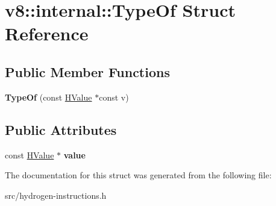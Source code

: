 \hypertarget{structv8_1_1internal_1_1_type_of}{}\section{v8\+:\+:internal\+:\+:Type\+Of Struct Reference}
\label{structv8_1_1internal_1_1_type_of}
\subsection*{Public Member Functions}
\begin{DoxyCompactItemize}
\item 
\hypertarget{structv8_1_1internal_1_1_type_of_a1ba1a45c67d36246ba6075172ca12ee0}{}{\bfseries Type\+Of} (const \hyperlink{classv8_1_1internal_1_1_h_value}{H\+Value} $\ast$const v)\label{structv8_1_1internal_1_1_type_of_a1ba1a45c67d36246ba6075172ca12ee0}

\end{DoxyCompactItemize}
\subsection*{Public Attributes}
\begin{DoxyCompactItemize}
\item 
\hypertarget{structv8_1_1internal_1_1_type_of_a3bf697bc781ad937a03f038097352ba0}{}const \hyperlink{classv8_1_1internal_1_1_h_value}{H\+Value} $\ast$ {\bfseries value}\label{structv8_1_1internal_1_1_type_of_a3bf697bc781ad937a03f038097352ba0}

\end{DoxyCompactItemize}


The documentation for this struct was generated from the following file\+:\begin{DoxyCompactItemize}
\item 
src/hydrogen-\/instructions.\+h\end{DoxyCompactItemize}

